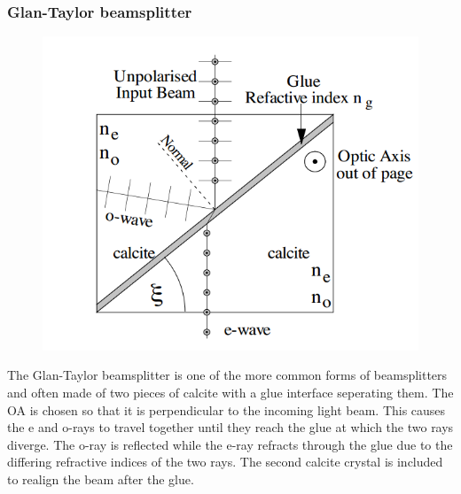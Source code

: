 \subsubsection{Glan-Taylor beamsplitter}
\begin{minipage}{0.47\linewidth}
	\begin{figure}[H]
	\includegraphics[scale=0.7]{Photonics/beamsplitter}
	\end{figure}
\end{minipage}
\begin{minipage}{0.47\linewidth}
	The Glan-Taylor beamsplitter is one of the more common forms of beamsplitters and often made of two pieces of calcite with a glue interface seperating them.  
	The OA is chosen so that it is perpendicular to the incoming light beam. 
	This causes the e and o-rays to travel together until they reach the glue at which the two rays diverge. 
	The o-ray is reflected while the e-ray refracts through the glue due to the differing refractive indices of the two rays.
	The second calcite crystal is included to realign the beam after the glue.
\end{minipage}
